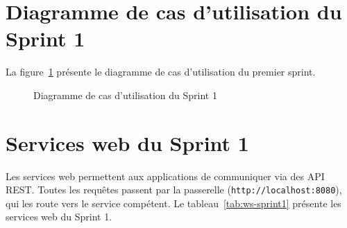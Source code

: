 \section{Diagramme de cas d'utilisation du Sprint 1}
La figure~\ref{fig:cu-sprint1} présente le diagramme de cas d'utilisation du premier sprint.
\begin{figure}[H]
    \centering
    \caption{Diagramme de cas d'utilisation du Sprint 1}
    \label{fig:cu-sprint1}
\end{figure}

\section{Services web du Sprint 1}
Les services web permettent aux applications de communiquer via des API REST. Toutes les requêtes passent par la passerelle (\texttt{http://localhost:8080}), qui les route vers le service compétent. Le tableau~\ref{tab:ws-sprint1} présente les services web du Sprint 1.

